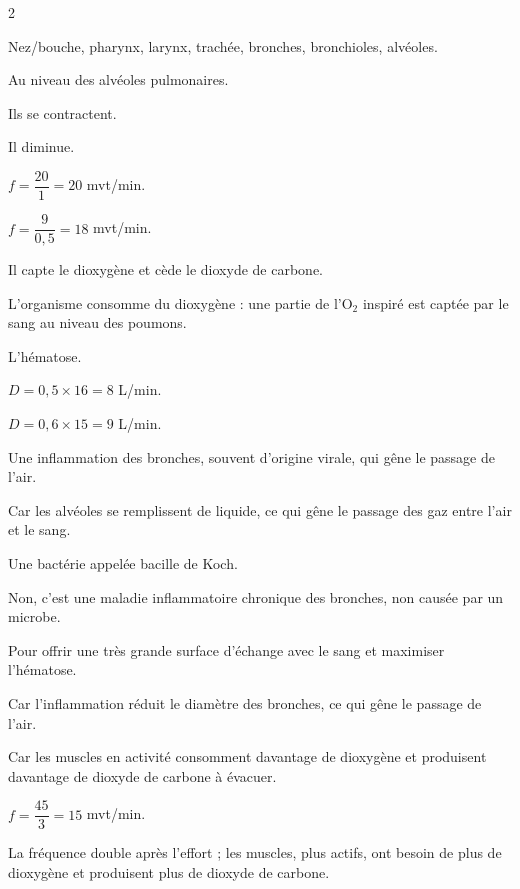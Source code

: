 \begin{multicols}{2}

Nez/bouche, pharynx, larynx, trachée, bronches, bronchioles, alvéoles.

Au niveau des alvéoles pulmonaires.

Ils se contractent.

Il diminue.

$f=\dfrac{20}1=20$ mvt/min.

$f=\dfrac9{0{,}5}=18$ mvt/min.

Il capte le dioxygène et cède le dioxyde de carbone.

L'organisme consomme du dioxygène : une partie de l'$\mathrm{O_2}$ inspiré est captée par
le sang au niveau des poumons.

L'hématose.

$D=0{,}5\times16=8$ L/min.

$D=0{,}6\times15=9$ L/min.

Une inflammation des bronches, souvent d'origine virale, qui gêne le passage de
l'air.

Car les alvéoles se remplissent de liquide, ce qui gêne le passage des gaz entre
l'air et le sang.

Une bactérie appelée bacille de Koch.

Non, c'est une maladie inflammatoire chronique des bronches, non causée par un
microbe.

Pour offrir une très grande surface d'échange avec le sang et maximiser l'hématose.

Car l'inflammation réduit le diamètre des bronches, ce qui gêne le passage de l'air.

Car les muscles en activité consomment davantage de dioxygène et produisent
davantage de dioxyde de carbone à évacuer.

$f=\dfrac{45}3=15$ mvt/min.

La fréquence double après l'effort ; les muscles, plus actifs, ont besoin de plus de
dioxygène et produisent plus de dioxyde de carbone.


\end{multicols}
